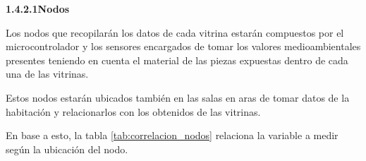     \newpage

    \textbf{1.4.2.1\hspace{5mm}Nodos}

    Los nodos que recopilarán los datos de cada vitrina estarán compuestos por el microcontrolador y los sensores encargados de tomar los valores medioambientales presentes teniendo en cuenta el material de las piezas expuestas dentro de cada una de las vitrinas.
    
    Estos nodos estarán ubicados también en las salas en aras de tomar datos de la habitación y relacionarlos con los obtenidos de las vitrinas.

    En base a esto, la tabla \ref{tab:correlacion_nodos} relaciona la variable a medir según la ubicación del nodo.

